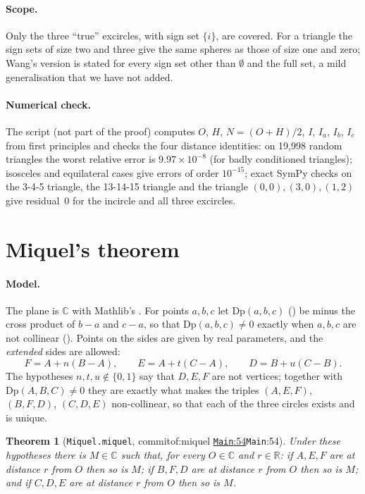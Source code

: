\documentclass[11pt]{article}
\newtheorem{theorem}{Theorem}
\theoremstyle{definition}
\theoremstyle{remark}
\newcommand{\RR}{\mathbb{R}}
\newcommand{\CC}{\mathbb{C}}
\newcommand{\commitof}[1]{\csname commitof:#1\endcsname}
\newcommand{\repo}[1]{https://github.com/jpbald93/#1}
\newcommand{\src}[4]{\ifcsname commitof:#1\endcsname
  \href{\repo{#1}/blob/\commitof{#1}/#2/#3.lean\#L#4}{\texttt{#3}:#4}\else\texttt{#3}:#4\fi}
\begin{document}
\paragraph{Scope.} Only the three ``true'' excircles, with sign set $\{i\}$, are covered. For a
triangle the sign sets of size two and three give the same spheres as those of size one and
zero; Wang's version is stated for every sign set other than $\emptyset$ and the full set, a mild
generalisation that we have not added.

\paragraph{Numerical check.} The script  (not part of the proof)
computes $O$, $H$, $N=(O+H)/2$, $I$, $I_a$, $I_b$, $I_c$ from first principles and checks the four
distance identities: on 19{,}998 random triangles the worst relative error is $9.97\times10^{-8}$
(for badly conditioned triangles); isosceles and equilateral cases give errors of order $10^{-15}$;
exact SymPy checks on the 3-4-5 triangle, the 13-14-15 triangle and the triangle $(0,0),(3,0),(1,2)$
give residual~$0$ for the incircle and all three excircles.

\section{Miquel's theorem}\label{sec:miquel}

\paragraph{Model.} The plane is $\CC$ with Mathlib's . For points $a,b,c$ let
$\mathrm{Dp}(a,b,c)$ () be minus the cross product of $b-a$ and $c-a$, so that
$\mathrm{Dp}(a,b,c)\ne0$ exactly when $a,b,c$ are not collinear
(). Points on the sides are given by real parameters, and the
\emph{extended} sides are allowed:
\[
F=A+n(B-A),\qquad E=A+t(C-A),\qquad D=B+u(C-B).
\]
The hypotheses $n,t,u\notin\{0,1\}$ say that $D,E,F$ are not vertices; together with
$\mathrm{Dp}(A,B,C)\ne0$ they are exactly what makes the triples $(A,E,F)$, $(B,F,D)$, $(C,D,E)$
non-collinear, so that each of the three circles exists and is unique.

\begin{theorem}[\texttt{Miquel.miquel}, \src{miquel}{Miquel}{Main}{54}]\label{thm:miquel}
Under these hypotheses there is $M\in\CC$ such that, for every $O\in\CC$ and $r\in\RR$: if
$A,E,F$ are at distance $r$ from $O$ then so is $M$; if $B,F,D$ are at distance $r$ from $O$ then
so is $M$; and if $C,D,E$ are at distance $r$ from $O$ then so is $M$.
\end{theorem}
\end{document}
